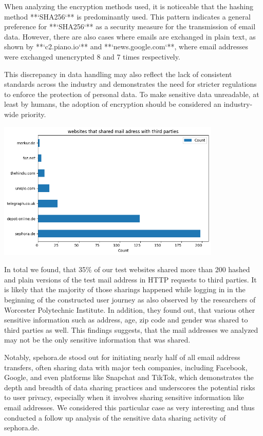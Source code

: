 When analyzing the encryption methods used, it is noticeable that the hashing method **`SHA256`** is predominantly used. This pattern indicates a general preference for **`SHA256`** as a security measure for the transmission of email data. However, there are also cases where emails are exchanged in plain text, as shown by **`c2.piano.io`** and **`news.google.com`**, where email addresses were exchanged unencrypted 8 and 7 times respectively.

This discrepancy in data handling may also reflect the lack of consistent standards across the industry and demonstrates the need for stricter regulations to enforce the protection of personal data. To make sensitive data unreadable, at least by humans, the adoption of encryption should be considered an industry-wide priority.

\vspace{0.5cm}
\includegraphics[width=0.8\textwidth]{./assets/websitesSharingMailAddresses.png}
\vspace{0.5cm}

In total we found, that 35\% of our test websites shared more than 200 hashed and plain versions of the test mail address in HTTP requests to third parties. It is likely that the majority of those sharings happened while logging in in the beginning of the constructed user journey as also observed by the researchers of Worcester Polytechnic Institute. In addition, they found out, that various other sensitive information such as address, age, zip code and gender was shared to third parties as well\cite{EmailLeaks}. This findings suggests, that the mail addresses we analyzed may not be the only sensitive information that was shared.

Notably, spehora.de stood out for initiating nearly half of all email address transfers, often sharing data with major tech companies, including Facebook, Google, and even platforms like Snapchat and TikTok, which demonstrates the depth and breadth of data sharing practices and underscores the potential risks to user privacy, especially when it involves sharing sensitive information like email addresses. We considered this particular case as very interesting and thus conducted a follow up analysis of the sensitive data sharing activity of sephora.de.

